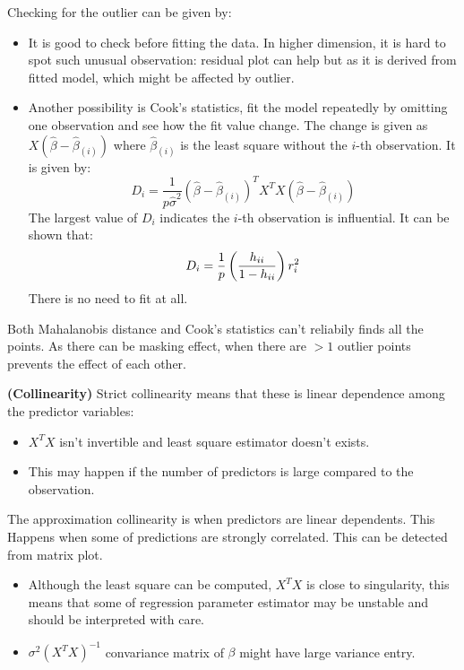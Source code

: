 \begin{remark}
    Checking for the outlier can be given by:
    \begin{itemize}
        \item It is good to check before fitting the data. In higher dimension, it is hard to spot such unusual observation: residual plot can help but as it is derived from fitted model, which might be affected by outlier. 
        \item Another possibility is Cook's statistics, fit the model repeatedly by omitting one observation and see how the fit value change. The change is given as $X(\hat{\beta} - \hat{\beta}_{(i)})$ where $\hat{\beta}_{(i)}$ is the least square without the $i$-th observation. It is given by:
        \begin{equation*}
            D_i = \frac{1}{p\hat{\sigma}^2}(\hat{\beta} - \hat{\beta}_{(i)})^TX^TX(\hat{\beta} - \hat{\beta}_{(i)})
        \end{equation*}
        The largest value of $D_i$ indicates the $i$-th observation is influential. It can be shown that:
        \begin{equation*}
            D_i = \frac{1}{p} \left( \frac{h_{ii}}{1-h_{ii}} \right)r_i^2
        \end{equation*}
        There is no need to fit at all. 
    \end{itemize}
    Both Mahalanobis distance and Cook's statistics can't reliabily finds all the points. As there can be masking effect, when there are $>1$ outlier points prevents the effect of each other. 
\end{remark}

\begin{remark}{\textbf{(Collinearity)}}
    Strict collinearity means that these is linear dependence among the predictor variables:
    \begin{itemize}
        \item $X^TX$ isn't invertible and least square estimator doesn't exists. 
        \item This may happen if the number of predictors is large compared to the observation. 
    \end{itemize}
    The approximation collinearity is when predictors are linear dependents. This Happens when some of predictions are strongly correlated. This can be detected from matrix plot. 
    \begin{itemize}
        \item Although the least square can be computed, $X^TX$ is close to singularity, this means that some of regression parameter estimator may be unstable and should be interpreted with care. 
        \item $\sigma^2(X^TX)^{-1}$ convariance matrix of $\beta$ might have large variance entry. 
    \end{itemize}
\end{remark}

